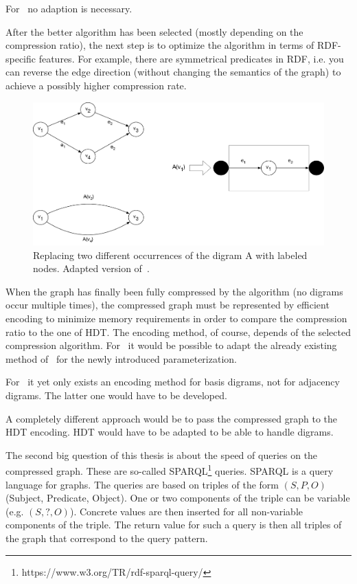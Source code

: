 \documentclass[a4paper]{scrartcl}
\begin{document}
For~\cite{mattdk} no adaption is necessary.

After the better algorithm has been selected (mostly depending on the compression ratio), the next step is to optimize the algorithm in terms of RDF-specific features. For example, there are symmetrical predicates in RDF, i.e. you can reverse the edge direction (without changing the semantics of the graph) to achieve a possibly higher compression rate.



\begin{figure}[h]
	\centering
	\includegraphics[width=1\textwidth]{img/maneth2}
	\caption{Replacing two different occurrences of the digram A with labeled nodes. Adapted version of~\cite{maneth}.}
	\label{fig:maneth2}
\end{figure}


When the graph has finally been fully compressed by the algorithm (no digrams occur multiple times), the compressed graph must be represented by efficient encoding to minimize memory requirements in order to compare the compression ratio to the one of HDT. The encoding method, of course, depends of the selected compression algorithm. For~\cite{maneth} it would be possible to adapt the already existing method of~\cite{maneth} for the newly introduced parameterization.

For~\cite{mattdk} it yet only exists an encoding method for basis digrams, not for adjacency digrams. The latter one would have to be developed.

A completely different approach would be to pass the compressed graph to the HDT encoding. HDT would have to be adapted to be able to handle digrams. 

The second big question of this thesis is about the speed of queries on the compressed graph. These are so-called SPARQL\footnote{\label{foot:1}https://www.w3.org/TR/rdf-sparql-query/} queries. SPARQL  is a query language for graphs. The queries are based on triples of the form $(S,P,O)$ (Subject, Predicate, Object). One or two components of the triple can be variable (e.g. $(S,?,O)$). Concrete values are then inserted for all non-variable components of the triple. The return value for such a query is then all triples of the graph that correspond to the query pattern.
\end{document}
